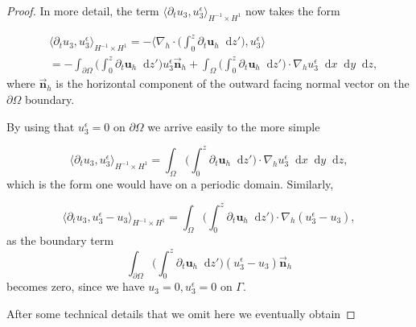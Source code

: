 \documentclass[11pt]{article}
\newcommand*\diff{\mathop{}\!\mathrm{d}}
\begin{document}
\begin{proof}
In more detail, the term $ \langle \partial_t u_3, u_3^\epsilon \rangle _{H^{-1} \times H^1}$ now takes the form 

\begin{equation}
\begin{split}
& \langle \partial_t u_3, u_3^\epsilon \rangle _{H^{-1} \times H^1} = - \bigg \langle \nabla_h \cdot \bigg ( \int_0^z \partial_t \mathbf{u}_h \diff z' \bigg ) , u_3^\epsilon \bigg \rangle \\
& = - \int_{\partial \Omega} \bigg ( \int_0^z \partial_t \mathbf{u}_h \diff z' \bigg ) u_3^\epsilon \vec{\boldsymbol{n}}_h + \int_\Omega \bigg ( \int_0^z \partial_t \mathbf{u}_h \diff z' \bigg) \cdot \nabla_h u_3^\epsilon \diff x \diff y \diff z,
\end{split}
\end{equation}
%
where $\vec{\boldsymbol{n}}_h$ is the horizontal component of the outward facing normal vector on the $\partial \Omega$ boundary.

By using that $u_3^\epsilon = 0$ on $\partial \Omega$ we arrive easily to the more simple

$$ \langle \partial_t u_3, u_3^\epsilon \rangle _{H^{-1} \times H^1} = \int_\Omega \bigg ( \int_0^z \partial_t \mathbf{u}_h \diff z' \bigg) \cdot \nabla_h u_3^\epsilon \diff x \diff y \diff z,$$
%
which is the form one would have on a periodic domain. Similarly, 

$$ \langle \partial_t u_3, u_3^\epsilon - u_3 \rangle _{H^{-1} \times H^1} = \int_\Omega \bigg ( \int_0^z \partial_t \mathbf{u}_h \diff z' \bigg) \cdot \nabla_h (u_3^\epsilon - u_3),$$ as the boundary term $$\int_{\partial \Omega} \bigg ( \int_0^z \partial_t \mathbf{u}_h \diff z' \bigg ) (u_3^\epsilon - u_3) \vec{\boldsymbol{n}}_h$$ becomes zero, since we have $u_3 = 0, u_3^\epsilon = 0$ on $\Gamma.$ 

After some technical details that we omit here we eventually obtain


\end{proof}
\end{document}
